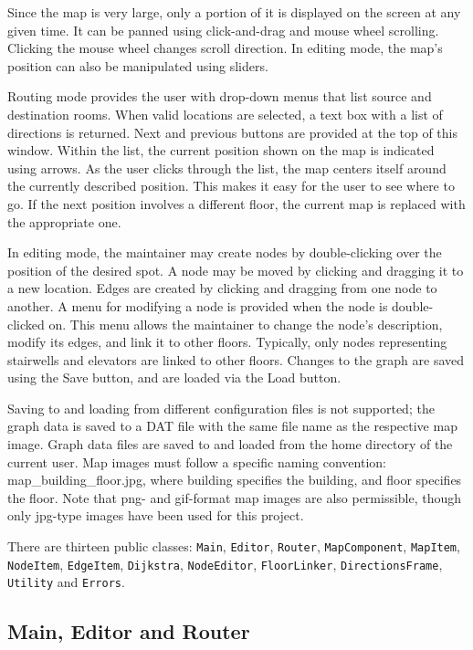 \documentclass[12pt,letterpaper,titlepage]{article}   %
\begin{document}
Since the map is very large, only a portion of it is displayed on the
screen at any given time. It can be panned using click-and-drag and
mouse wheel scrolling. Clicking the mouse wheel changes scroll
direction. In editing mode, the map's position can also be manipulated
using sliders.

Routing mode provides the user with drop-down menus that list source and
destination rooms. When valid locations are selected, a text box with a
list of directions is returned. Next and previous buttons are provided
at the top of this window. Within the list, the current position shown
on the map is indicated using arrows. As the user clicks through the
list, the map centers itself around the currently described position.
This makes it easy for the user to see where to go. If the next position
involves a different floor, the current map is replaced with the
appropriate one.

In editing mode, the maintainer may create nodes by double-clicking over
the position of the desired spot. A node may be moved by clicking and
dragging it to a new location. Edges are created by clicking and
dragging from one node to another. A menu for modifying a node is
provided when the node is double-clicked on. This menu allows the
maintainer to change the node's description, modify its edges, and link
it to other floors. Typically, only nodes representing stairwells and
elevators are linked to other floors. Changes to the graph are saved
using the Save button, and are loaded via the Load button.

Saving to and loading from different configuration files is not
supported; the graph data is saved to a DAT file with the same file name
as the respective map image. Graph data files are saved to and loaded
from the home directory of the current user. Map images must follow a
specific naming convention: map\_building\_floor.jpg, where building
specifies the building, and floor specifies the floor. Note that png-
and gif-format map images are also permissible, though only jpg-type
images have been used for this project.

There are thirteen public classes: \texttt{Main}, \texttt{Editor}, 
\texttt{Router}, \texttt{MapComponent}, \texttt{MapItem}, 
\texttt{NodeItem}, \texttt{EdgeItem}, \texttt{Dijkstra}, 
\texttt{NodeEditor}, \texttt{FloorLinker}, \texttt{DirectionsFrame},
\texttt{Utility} and \texttt{Errors}.

\subsection{Main, Editor and Router}
\end{document}
